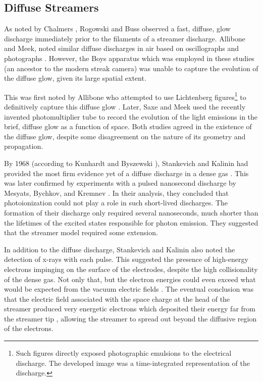 \subsection{Diffuse Streamers}

As noted by Chalmers \cite{Chalmers1971}, Rogowski and Buss \cite{Rogowski1927,
Buss1932} observed a fast, diffuse, glow discharge immediately prior to the
filaments of a streamer discharge. Allibone and Meek, noted similar diffuse
discharges in air based on oscillographs and photographs \cite{Allibone1938,
Allibone1938b, Allibone1938c}. However, the Boys apparatus \cite{Boys1926} which
was employed in these studies (an ancestor to the modern streak camera) was
unable to capture the evolution of the diffuse glow, given its large spatial
extent.

This was first noted by Allibone who attempted to use Lichtenberg
figures\footnote{Such figures directly exposed photographic emulsions to the
electrical discharge. The developed image was a time-integrated representation
of the discharge.} to definitively capture this diffuse glow
\cite{Allibone1948}. Later, Saxe and Meek used the recently invented
photomultiplier tube to record the evolution of the light emissions in the
brief, diffuse glow \cite{Saxe1948} as a function of space. Both studies
agreed in the existence of the diffuse glow, despite some disagreement on the
nature of its geometry and propagation.

By 1968 (according to Kunhardt and Byszewski \cite{Kunhardt1980}), Stankevich
and Kalinin had provided the most firm evidence yet of a diffuse discharge in a
dense gas \cite{Stankevich1968}. This was later confirmed by experiments with a
pulsed nanosecond discharge by Mesyats, Bychkov, and Kremnev \cite{Mesyats1972}.
In their analysis, they concluded that photoionization could not play a role in
such short-lived discharges. The formation of their discharge only required
several nanoseconds, much shorter than the lifetimes of the excited states
responsible for photon emission. They suggested that the streamer model required
some extension.

In addition to the diffuse discharge, Stankevich and Kalinin also noted the
detection of x-rays with each pulse. This suggested the presence of high-energy
electrons impinging on the surface of the electrodes, despite the high
collisionality of the dense gas. Not only that, but the electron energies could
even exceed what would be expected from the vacuum electric fields
\cite{Babich1977}. The eventual conclusion was that the electric field
associated with the space charge at the head of the streamer produced very
energetic electrons which deposited their energy far from the streamer tip
\cite{Kunhardt1980, Babich1990}, allowing the streamer to spread out beyond the
diffusive region of the electrons.


